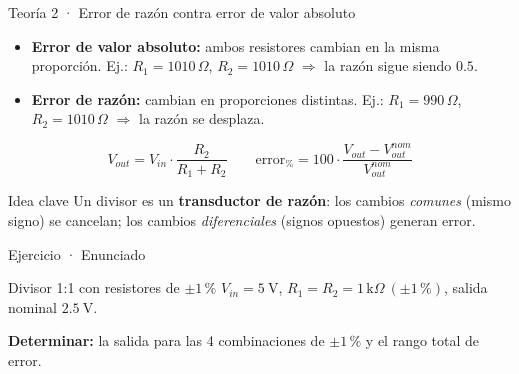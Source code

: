 \documentclass[aspectratio=169]{beamer}
\begin{document}
\begin{frame}{Teoría 2 · Error de razón contra error de valor absoluto}
  \begin{itemize}
    \item \textbf{Error de valor absoluto:} ambos resistores cambian en la misma proporción.
      Ej.: $R_1 = 1010\,\Omega$, $R_2 = 1010\,\Omega$ $\Rightarrow$ la razón sigue siendo $0.5$.
    \item \textbf{Error de razón:} cambian en proporciones distintas.
      Ej.: $R_1 = 990\,\Omega$, $R_2 = 1010\,\Omega$ $\Rightarrow$ la razón se desplaza.
  \end{itemize}
  \[
    V_{out} = V_{in}\cdot\frac{R_2}{R_1+R_2}
    \qquad
    \text{error}_{\%} = 100\cdot\frac{V_{out}-V_{out}^{nom}}{V_{out}^{nom}}
  \]
  \pause
  \begin{block}{Idea clave}
    Un divisor es un \textbf{transductor de razón}: los cambios \emph{comunes} (mismo signo)
    se cancelan; los cambios \emph{diferenciales} (signos opuestos) generan error.
  \end{block}
\end{frame}

\begin{frame}{Ejercicio · Enunciado}
  \begin{block}{Divisor 1:1 con resistores de $\pm 1\,\text{\%}$}
    \centering
    $V_{in} = \SI{5}{\volt}$, \quad $R_1 = R_2 = 1\,\text{k}\Omega\ (\pm 1\,\text{\%})$, \quad salida nominal $\SI{2.5}{\volt}$.
  \end{block}
  \begin{center}
  \end{center}
  \textbf{Determinar:} la salida para las 4 combinaciones de $\pm 1\,\text{\%}$ y el rango total de error.
\end{frame}
\end{document}
